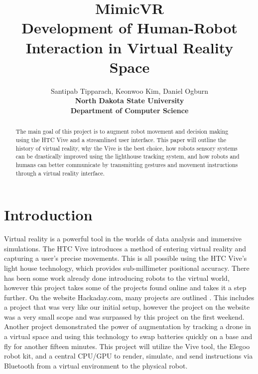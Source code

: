 \documentclass[10pt,a4paper]{article}
\title{\textbf{\Huge MimicVR \\
	\Large  Development of Human-Robot Interaction in Virtual Reality Space}}
\author{Santipab Tipparach, Keonwoo Kim, Daniel Ogburn\\
	\textbf{North Dakota State University}\\\textbf{Department of Computer Science}}
\begin{document}
\maketitle


\begin{abstract}

	The main goal of this project is to augment robot movement and decision making using the HTC Vive and a streamlined user interface. This paper will outline the history of virtual reality, why the Vive is the best choice, how robots sensory systems can be drastically improved using the lighthouse tracking system, and how robots and humans can better communicate by transmitting gestures and movement instructions through a virtual reality interface.

\end{abstract}

	\section{Introduction}
	Virtual reality is a powerful tool in the worlds of data analysis and immersive simulations. The HTC Vive introduces a method of entering virtual reality and capturing a user's precise movements. This is all possible using the HTC Vive's light house technology, which provides sub-millimeter positional accuracy. There has been some work already done introducing robots to the virtual world, however this project takes some of the projects found online and takes it a step further. On the website Hackaday.com, many projects are outlined \cite{hack1}. This includes a project that was very like our initial setup, however the project on the website was a very small scope and was surpassed by this project on the first weekend. Another project demonstrated the power of augmentation by tracking a drone in a virtual space and using this technology to swap batteries quickly on a base and fly for another fifteen minutes. This project will utilize the Vive tool, the Elegoo robot kit, and a central CPU/GPU to render, simulate, and send instructions via Bluetooth from a virtual environment to the physical robot.
\end{document}
